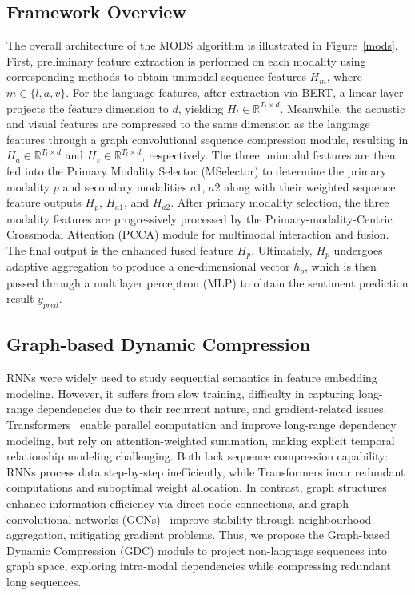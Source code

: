\documentclass[letterpaper]{article} %
\begin{document}
\subsection{Framework Overview}
The overall architecture of the MODS algorithm is illustrated in Figure~\ref{mods}. First, preliminary feature extraction is performed on each modality using corresponding methods to obtain unimodal sequence features \( H_m  \), where \( m \in \{ l, a, v \} \). For the language features, after extraction via BERT, a linear layer projects the feature dimension to \( d \), yielding \( H_l \in \mathbb{R}^{T_{l} \times d} \). Meanwhile, the acoustic and visual features are compressed to the same dimension as the language features through a graph convolutional sequence compression module, resulting in \( H_a \in \mathbb{R}^{T_{l} \times d} \) and \( H_v \in \mathbb{R}^{T_{l} \times d} \), respectively.  
The three unimodal features are then fed into the Primary Modality Selector (MSelector) to determine the primary modality \( p \) and secondary modalities \( a1 \), \( a2 \) along with their weighted sequence feature outputs \( H_p \), \( H_{a1} \), and \( H_{a2} \).  
After primary modality selection, the three modality features are progressively processed by the Primary-modality-Centric Crossmodal Attention (PCCA) module for multimodal interaction and fusion. The final output is the enhanced fused feature \( H_p \).  
Ultimately, \( H_p \) undergoes adaptive aggregation to produce a one-dimensional vector \( h_p \), which is then passed through a multilayer perceptron (MLP) to obtain the sentiment prediction result \( y_{pred} \).

\subsection{Graph-based Dynamic Compression}
RNNs \cite{hochreiter1997long} were widely used to study sequential semantics in feature embedding modeling. However, it suffers from slow training, difficulty in capturing long-range dependencies due to their recurrent nature, and gradient-related issues. Transformers~\cite{vaswani2017attention} enable parallel computation and improve long-range dependency modeling, but rely on attention-weighted summation, making explicit temporal relationship modeling challenging. Both lack sequence compression capability: RNNs process data step-by-step inefficiently, while Transformers incur redundant computations and suboptimal weight allocation. In contrast, graph structures enhance information efficiency via direct node connections, and graph convolutional networks (GCNs)~\cite{kipf2016semi} improve stability through neighbourhood aggregation, mitigating gradient problems. Thus, we propose the Graph-based Dynamic Compression (GDC) module to project non-language sequences into graph space, exploring intra-modal dependencies while compressing redundant long sequences. 
\end{document}
